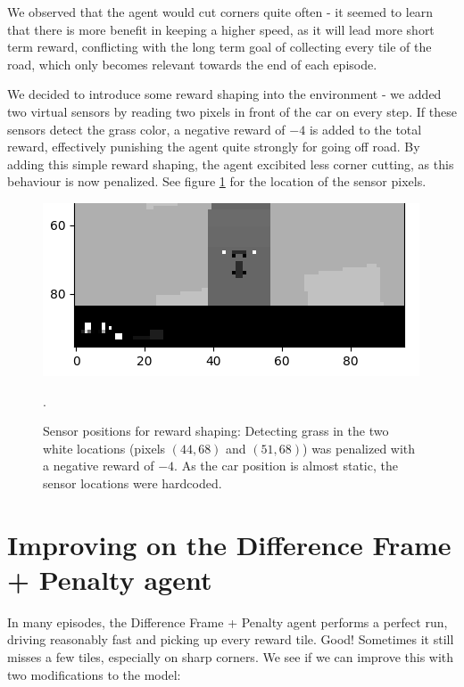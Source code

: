 \documentclass[a4paper, 11pt, conference]{ieeeconf}      %
\begin{document}
We observed that the agent would cut corners quite often - it seemed to learn that there is more benefit in keeping a higher speed, as it will lead more short term reward, conflicting with the long term goal of collecting every tile of the road, which only becomes relevant towards the end of each episode.

We decided to introduce some reward shaping into the environment - we added two virtual sensors by reading two pixels in front of the car on every step. If these sensors detect the grass color, a negative reward of $-4$ is added to the total reward, effectively punishing the agent quite strongly for going off road. By adding this simple reward shaping, the agent excibited less corner cutting, as this behaviour is now penalized. See figure \ref{fig:reward_shaping} for the location of the sensor pixels.

\begin{figure}
  \includegraphics[width=\linewidth]{figs/reward_shaping_closeup.png}
  \caption{Sensor positions for reward shaping: Detecting grass in the two white locations (pixels $(44, 68)$ and $(51,68)$) was penalized with a negative reward of $-4$. As the car position is almost static, the sensor locations were hardcoded.}.
  \label{fig:reward_shaping}
\end{figure}

\section{Improving on the Difference Frame + Penalty agent}

In many episodes, the Difference Frame + Penalty agent performs a perfect run, driving reasonably fast and picking up every reward tile. Good! Sometimes it still misses a few tiles, especially on sharp corners. We see if we can improve this with two modifications to the model:
\end{document}
